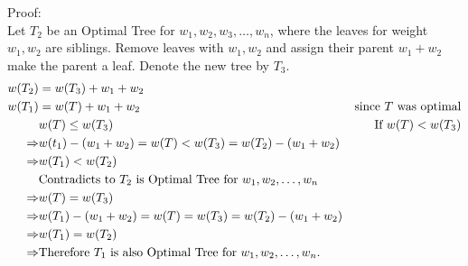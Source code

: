 \documentclass[a4paper]{article}
\begin{document}
Proof:\\
Let $T_2$ be an Optimal Tree for $w_1, w_2, w_3, \ldots , w_n$, where the leaves for weight $w_1, w_2$ are siblings. Remove leaves with $w_1, w_2$ and assign their parent $w_1+w_2$ make the parent a leaf. Denote the new tree by $T_3$.
\begin{align*}
    w(T_2) &= w(T_3)+w_1+w_2\\
    w(T_1) &= w(T)+w_1+w_2&\hfill \text{since $T$ was optimal} \\
    &w(T)\leq w(T_3)&\hfill \text{If $w(T) < w(T_3)$}\\
    \Rightarrow &w(t_1)-(w_1+w_2)=w(T)<w(T_3)=w(T_2)-(w_1+w_2)\\
    \Rightarrow &w(T_1) < w(T_2)\\
    &\text{Contradicts to $T_2$ is Optimal Tree for $w_1,w_2,\ldots,w_n$}\\
    \Rightarrow &w(T)=w(T_3)\\
    \Rightarrow & w(T_1)-(w_1+w_2) = w(T)=w(T_3)=w(T_2)-(w_1+w_2)\\
    \Rightarrow&w(T_1)=w(T_2)\\
    \Rightarrow&\text{Therefore $T_1$ is also Optimal Tree for $w_1,w_2,\ldots, w_n$.}
\end{align*}
\end{document}
